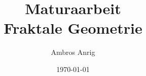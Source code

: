 

\title{Maturaarbeit \\ Fraktale Geometrie}
\author{Ambros Anrig}
\date{\today}



\maketitle
\thispagestyle{empty}

\clearpage
\tableofcontents
\thispagestyle{empty}












